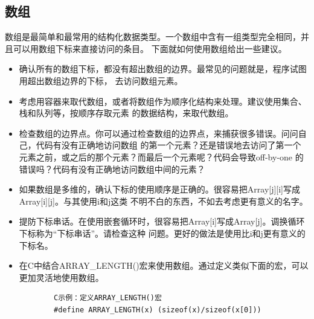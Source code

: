 \documentclass{article}
\begin{document}
\subsection{数组}
数组是最简单和最常用的结构化数据类型。一个数组中含有一组类型完全相同，并且可以用数组下标来直接访问的条目。
下面就如何使用数组给出一些建议。
\begin{itemize}
    \item 确认所有的数组下标，都没有超出数组的边界。最常见的问题就是，程序试图用超出数组边界的下标，
    去访问数组元素。
    \item 考虑用容器来取代数组，或者将数组作为顺序化结构来处理。建议使用集合、栈和队列等，按顺序存取元素
    的数据结构，来取代数组。
    \item 检查数组的边界点。你可以通过检查数组的边界点，来捕获很多错误。问问自己，代码有没有正确地访问数组
    的第一个元素？还是错误地去访问了第一个元素之前，或之后的那个元素？而最后一个元素呢？代码会导致off-by-one
    的错误吗？代码有没有正确地访问数组中间的元素？
    \item 如果数组是多维的，确认下标的使用顺序是正确的。很容易把Array[j][i]写成Array[i][j]。与其使用i和j这类
    不明不白的东西，不如去考虑更有意义的名字。
    \item 提防下标串话。在使用嵌套循环时，很容易把Array[i]写成Array[j]。调换循环下标称为“下标串话”。请检查这种
    问题。更好的做法是使用比i和j更有意义的下标名。
    \item 在C中结合ARRAY\_LENGTH()宏来使用数组。通过定义类似下面的宏，可以更加灵活地使用数组。
    \begin{lstlisting}
        C示例：定义ARRAY_LENGTH()宏
        #define ARRAY_LENGTH(x) (sizeof(x)/sizeof(x[0]))
    \end{lstlisting}
\end{itemize}
\end{document}
